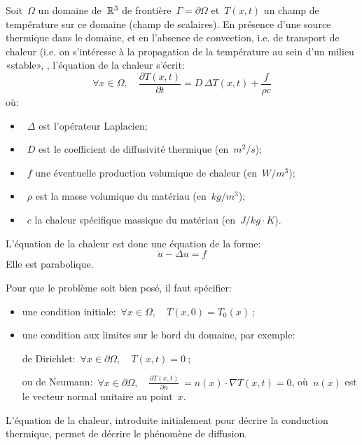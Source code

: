 \medskip
Soit~$\Omega$ un domaine de~$\mathbb R^3$ de frontière~$\Gamma=\partial \Omega$ et~$T(x,t)$ 
un champ de température sur ce domaine (champ de scalaires). 
En présence d'une source thermique dans le domaine, et en l'absence de convection, i.e.
de transport de chaleur (i.e. on s'intéresse à la propagation de la température au sein d'un 
milieu «stable», , 
l'équation de la chaleur s'écrit:
\begin{equation}
\forall x \in\Omega, \quad \frac{\partial T (x,t)}{\partial t} = D \, \Delta T(x,t) + \frac{f}{\rho c}
\end{equation}
où:
\begin{itemize}
  \item~$\Delta$ est l'opérateur Laplacien;
  \item~$D$ est le coefficient de diffusivité thermique (en~$m^2/s$);
  \item~$f$ une éventuelle production volumique de chaleur (en~$W/m^3$);
  \item~$\rho$ est la masse volumique du matériau (en~$kg/m^3$);
  \item~$c$ la chaleur spécifique massique du matériau (en~$J/kg·K$).
\end{itemize}

\medskip{}
L'équation de la chaleur est donc une équation de la forme:
\begin{equation}
\dot{u}-\Delta u=f
\end{equation}
Elle est parabolique.

\medskip
Pour que le problème soit bien posé, il faut spécifier:
\begin{itemize}
  \item une condition initiale:~$\forall x\in\Omega, \quad T (x,0) = T_0(x)~$;
  \item une condition aux limites sur le bord du domaine, par exemple:

    de Dirichlet:~$\forall x\in\partial \Omega, \quad T (x,t) = 0~$;

    ou de Neumann:~$\forall x\in\partial \Omega, \quad \frac{\partial T (x,t)}{\partial n} \ 
	= n(x) \cdot \nabla T(x,t) = 0$, où~$n(x)$ est le vecteur normal unitaire au point~$x$.
\end{itemize}

\medskip
L'équation de la chaleur, introduite initialement pour décrire la conduction thermique, permet
de décrire le phénomène de diffusion.


